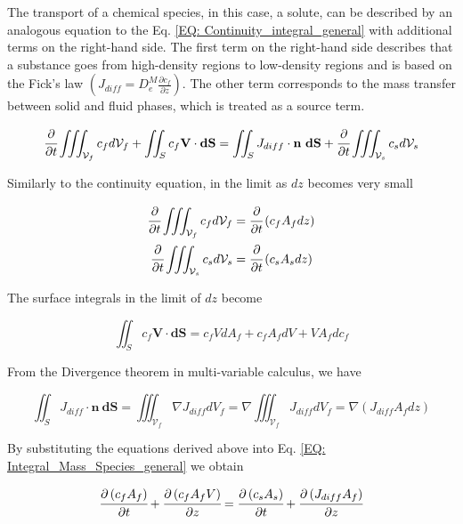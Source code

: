 \documentclass[../Article_Model_Parameters.tex]{subfiles}
\begin{document}
	The transport of a chemical species, in this case, a solute, can be described by an analogous equation to the Eq. \ref{EQ: Continuity_integral_general} with additional terms on the right-hand side. The first term on the right-hand side describes that a substance goes from high-density regions to low-density regions and is based on the Fick's law $\left( J_{diff} = D_e^M\frac{\partial c_f}{\partial z} \right)$. The other term corresponds to the mass transfer between solid and fluid phases, which is treated as a source term.
	
	{\footnotesize
		\begin{equation}
			\cfrac{\partial}{\partial t} \iiint_{\mathcal{V}_f} c_f d\mathcal{V}_f + \iint_S c_f \textbf{V} \cdot \textbf{dS} = \iint_S J_{diff} \cdot \textbf{n}~\textbf{dS} + \cfrac{\partial}{\partial t} \iiint_{\mathcal{V}_s} c_s d\mathcal{V}_s
			\label{EQ: Integral_Mass_Species_general}
		\end{equation}
	}
	
	Similarly to the continuity equation, in the limit as $dz$ becomes very small
	
	{\footnotesize
		\begin{align}
			\cfrac{\partial}{\partial t} \iiint_{\mathcal{V}_f} c_f d\mathcal{V}_f &= \cfrac{\partial}{\partial t}\left( c_f A_f dz \right) \\
			\cfrac{\partial}{\partial t} \iiint_{\mathcal{V}_s} c_s d\mathcal{V}_s &= \cfrac{\partial}{\partial t}\left( c_s A_s dz \right)
		\end{align}
	}

	The surface integrals in the limit of $dz$ become
	
	{\footnotesize
		\begin{equation}
			\iint_S c_f \textbf{V} \cdot \textbf{dS} = c_f V dA_f + c_f A_f dV + V A_f dc_f 
		\end{equation}
	}
	
	From the Divergence theorem in multi-variable calculus, we have
	
	{\footnotesize
		\begin{equation}
			\iint_S J_{diff} \cdot \textbf{n}~\textbf{dS} = \iiint_{\mathcal{V}_f} \nabla J_{diff} dV_f = \nabla \iiint_{\mathcal{V}_f} J_{diff} dV_f = \nabla \left( J_{diff} A_f dz \right)
		\end{equation}
	}
	
	By substituting the equations derived above into Eq. \ref{EQ: Integral_Mass_Species_general} we obtain
	
	{\footnotesize
		\begin{equation}
			\cfrac{\partial \left( c_f A_f \right)}{\partial t} + \cfrac{\partial \left( c_f A_f V \right)}{\partial z} = \cfrac{\partial \left( c_s A_s \right) }{\partial t} + \cfrac{\partial \left( J_{diff} A_f \right) }{\partial z}
		\end{equation}
	}
\end{document}
